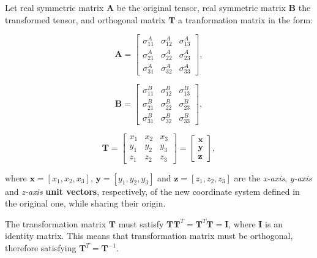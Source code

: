 Let real symmetric matrix  $\mathbf{A}$ be the original tensor,
real symmetric matrix $\mathbf{B}$ the transformed tensor, and
orthogonal matrix $\mathbf{T}$ a tranformation matrix in the form:

\begin{equation}
    \mathbf{A} = \begin{bmatrix}
        \sigma^{A}_{11} & \sigma^{A}_{12} & \sigma^{A}_{13} \\
        \sigma^{A}_{21} & \sigma^{A}_{22} & \sigma^{A}_{23} \\
        \sigma^{A}_{31} & \sigma^{A}_{32} & \sigma^{A}_{33}
    \end{bmatrix}
,\end{equation}

\begin{equation}
    \mathbf{B} = \begin{bmatrix}
        \sigma^{B}_{11} & \sigma^{B}_{12} & \sigma^{B}_{13} \\
        \sigma^{B}_{21} & \sigma^{B}_{22} & \sigma^{B}_{23} \\
        \sigma^{B}_{31} & \sigma^{B}_{32} & \sigma^{B}_{33}
    \end{bmatrix}
,\end{equation}

\begin{equation}
    \mathbf{T} = \begin{bmatrix}
        x_1 & x_2 & x_3 \\
        y_1 & y_2 & y_3 \\
        z_1 & z_2 & z_3
    \end{bmatrix} = \begin{bmatrix}
        \mathbf{x} \\
        \mathbf{y} \\
        \mathbf{z}
    \end{bmatrix}
,\end{equation}

where $\mathbf{x} = [x_1, x_2, x_3]$, $\mathbf{y} = [y_1, y_2, y_3]$ and
$\mathbf{z} = [z_1, z_2, z_3]$ are the \textit{x-axis}, \textit{y-axis} and
\textit{z-axis} \textbf{unit vectors}, respectively, of the new coordinate
system defined in the original one, while sharing their origin.

The transformation matrix $\mathbf{T}$ must satisfy
$\mathbf{T}\mathbf{T}^{T} = \mathbf{T}^{T}\mathbf{T} = \mathbf{I}$, where $\mathbf{I}$
is an identity matrix. This means that transformation matrix must be orthogonal,
therefore satisfying $\mathbf{T}^{T} = \mathbf{T}^{-1}$.

